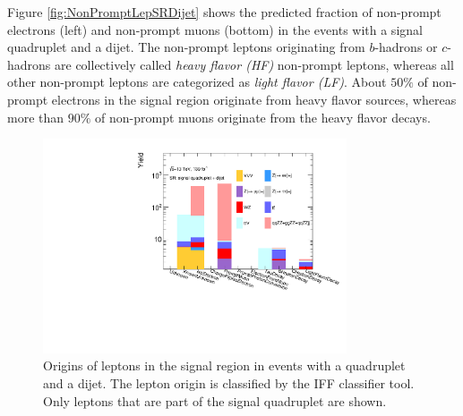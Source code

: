Figure \ref{fig:NonPromptLepSRDijet} shows the predicted fraction of non-prompt electrons (left) and non-prompt muons (bottom) in the events with a signal quadruplet and a dijet. The non-prompt leptons originating from $b$-hadrons or $c$-hadrons are collectively called \textit{heavy flavor (HF)} non-prompt leptons, whereas all other non-prompt leptons are categorized as \textit{light flavor (LF)}. About $50\%$ of non-prompt electrons in the signal region originate from heavy flavor sources, whereas more than $90\%$ of non-prompt muons originate from the heavy flavor decays.

\begin{figure}[!htb]
    \centering
    \includegraphics[width = 0.8\textwidth]{figures/Analysis/Background/AllLeptonSRDijetComposition.pdf}
    \caption{ Origins of leptons in the signal region in events with a quadruplet and a dijet. The lepton origin is classified by the IFF classifier tool. Only leptons that are part of the signal quadruplet are shown.\label{fig:LeptonCompositionSRVBS}}
\end{figure}

